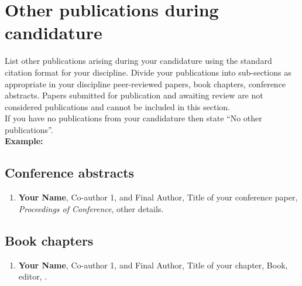 



\section*{Other publications during candidature}

\begin{instructional}
    List other publications arising during your candidature using the standard citation format for your discipline. Divide your publications into sub-sections as appropriate in your discipline \eg{} peer-reviewed papers, book chapters, conference abstracts. Papers submitted for publication and awaiting review are not considered publications and cannot be included in this section.\\
    
    \noindent
    If you have no publications from your candidature then state ``No other publications''.\\
    
    \textbf{Example:}
    \subsection*{Conference abstracts}

    \begin{enumerate}

    \item \cite{DumyCitationKey} \textbf{Your Name}, Co-author 1, and Final Author, Title of your conference paper, \textit{Proceedings of Conference}, other details.

    \end{enumerate}

    \subsection*{Book chapters}

    \begin{enumerate}

    \item \cite{DumyCitationKey} \textbf{Your Name}, Co-author 1, and Final Author, Title of your chapter, Book, editor, \etc{}.

    \end{enumerate}

\end{instructional}

